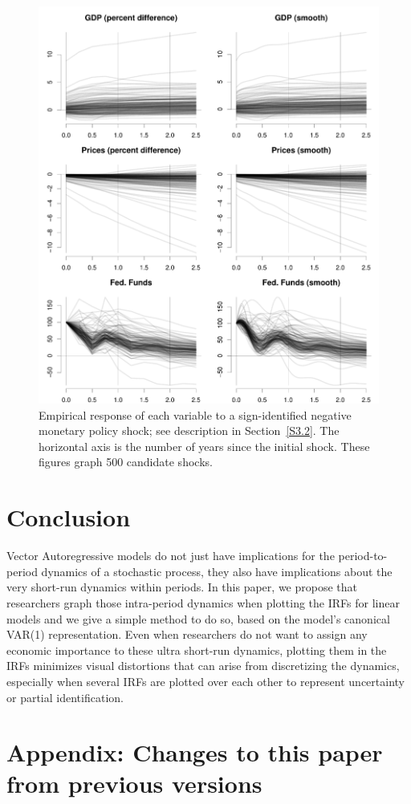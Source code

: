 \documentclass[12pt,fleqn]{article}
\begin{document}
\begin{figure}[t]
  \centering
  \includegraphics{graphs/empirics}
  \caption{%
    Empirical response of each variable to a sign-identified negative
    monetary policy shock; see description in Section~\ref{S3.2}. The
    horizontal axis is the number of years since the initial
    shock. These figures graph 500 candidate shocks.}
  \label{fig:5}
\end{figure}

\section{Conclusion}
\label{S4}

Vector Autoregressive models do not just have implications for the
period-to-period dynamics of a stochastic process, they also have
implications about the very short-run dynamics within periods. In this
paper, we propose that researchers graph those intra-period dynamics
when plotting the IRFs for linear models and we give a simple method
to do so, based on the model's canonical VAR(1) representation. Even
when researchers do not want to assign any economic importance to
these ultra short-run dynamics, plotting them in the IRFs minimizes
visual distortions that can arise from discretizing the dynamics,
especially when several IRFs are plotted over each other to
represent uncertainty or partial identification.

\clearpage
{}


\clearpage
\appendix
\section{Appendix: Changes to this paper from previous versions}

\end{document}
